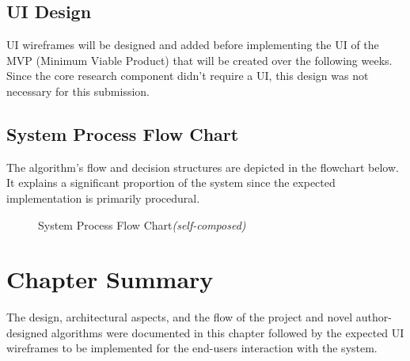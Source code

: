 \subsection{UI Design}
UI wireframes will be designed and added before implementing the UI of the MVP (Minimum Viable Product) that will be created over the following weeks. Since the core research component didn't require a UI, this design was not necessary for this submission.

\subsection{System Process Flow Chart}
The algorithm's flow and decision structures are depicted in the flowchart below. It explains a significant proportion of the system since the expected implementation is primarily procedural.

\begin{figure}[h!]
\centering
\setlength{\fboxsep}{10pt}%
\setlength{\fboxrule}{0.5pt}%
\caption{System Process Flow Chart\textit{(self-composed)}}
\label{fig:system-process-flowchart}
\end{figure}


\section{Chapter Summary}
The design, architectural aspects, and the flow of the project and novel author-designed algorithms were documented in this chapter followed by the expected UI wireframes to be implemented for the end-users interaction with the system.
